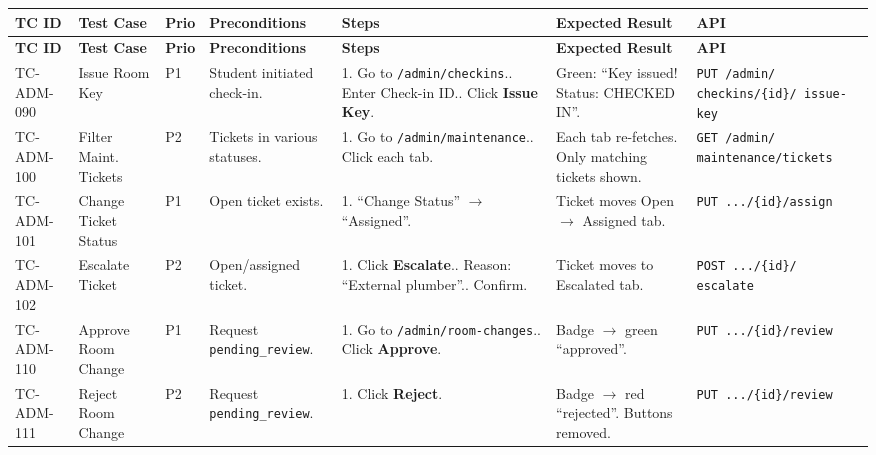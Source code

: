 \documentclass[12pt,a4paper]{article}
\begin{document}
\begin{longtable}{L{2cm} L{3cm} L{1cm} L{4cm} L{5.5cm} L{5.5cm} L{3cm}}
\toprule
\textbf{TC ID} & \textbf{Test Case} & \textbf{Prio} & \textbf{Preconditions} & \textbf{Steps} & \textbf{Expected Result} & \textbf{API} \\
\midrule
\endfirsthead \toprule \textbf{TC ID} & \textbf{Test Case} & \textbf{Prio} & \textbf{Preconditions} & \textbf{Steps} & \textbf{Expected Result} & \textbf{API} \\ \midrule \endhead \bottomrule \endfoot

TC-ADM-090 & Issue Room Key & P1 & Student initiated check-in. & 1. Go to \texttt{/admin/checkins}.. Enter Check-in ID.. Click \textbf{Issue Key}. & Green: ``Key issued! Status: CHECKED IN''. & \texttt{PUT /admin/ checkins/\{id\}/ issue-key} \\
\midrule
TC-ADM-100 & Filter Maint. Tickets & P2 & Tickets in various statuses. & 1. Go to \texttt{/admin/maintenance}.. Click each tab. & Each tab re-fetches. Only matching tickets shown. & \texttt{GET /admin/ maintenance/tickets} \\
\midrule
TC-ADM-101 & Change Ticket Status & P1 & Open ticket exists. & 1. ``Change Status'' $\rightarrow$ ``Assigned''. & Ticket moves Open $\rightarrow$ Assigned tab. & \texttt{PUT .../\{id\}/assign} \\
\midrule
TC-ADM-102 & Escalate Ticket & P2 & Open/assigned ticket. & 1. Click \textbf{Escalate}.. Reason: ``External plumber''.. Confirm. & Ticket moves to Escalated tab. & \texttt{POST .../\{id\}/ escalate} \\
\midrule
TC-ADM-110 & Approve Room Change & P1 & Request \texttt{pending\_review}. & 1. Go to \texttt{/admin/room-changes}.. Click \textbf{Approve}. & Badge $\rightarrow$ green ``approved''. & \texttt{PUT .../\{id\}/review} \\
\midrule
TC-ADM-111 & Reject Room Change & P2 & Request \texttt{pending\_review}. & 1. Click \textbf{Reject}. & Badge $\rightarrow$ red ``rejected''. Buttons removed. & \texttt{PUT .../\{id\}/review} \\
\end{longtable}

\end{document}
